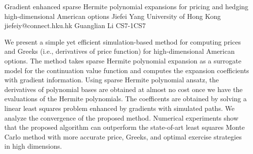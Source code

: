 \begin{talk}
  {Gradient enhanced sparse Hermite polynomial expansions for pricing and hedging high-dimensional American options}%
  {Jiefei Yang}%
  {University of Hong Kong}%
  {jiefeiy@connect.hku.hk}%
  {Guanglian Li}%
{}{}{CS7-1}{CS7}

			
We present a simple yet efficient simulation-based method for computing prices and Greeks (i.e., derivatives of price function) for high-dimensional American options. The method takes sparse Hermite polynomial expansion as a surrogate model for the continuation value function and computes the expansion coefficients with gradient information. Using sparse Hermite polynomial ansatz, the derivatives of polynomial bases are obtained at almost no cost once we have the evaluations of the Hermite polynomials. The coefficents are obtained by solving a linear least squares problem enhanced by gradients with simulated paths. We analyze the convergence of the proposed method. Numerical experiments show that the proposed algorithm can outperform the state-of-art least squares Monte Carlo method with more accurate price, Greeks, and optimal exercise strategies in high dimensions. 

\medskip


\end{talk}

